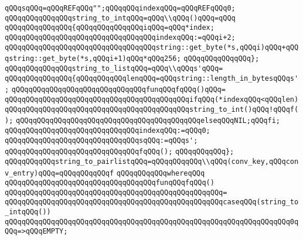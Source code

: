 \verb|qQQqsqQQq=qQQqREFqQQq"";qQQqqQQqindexqQQq=qQQqREFqQQq0;|\newline
\verb|qQQqqQQqqQQqqQQqstring_to_intqQQq=qQQq\\qQQq()qQQq=qQQq|\newline
\verb|qQQqqQQqqQQqqQQq{qQQqqQQqqQQqqQQqiqQQq=qQQq*index;|\newline
\verb|qQQqqQQqqQQqqQQqqQQqqQQqqQQqqQQqqQQqindexqQQq:=qQQqi+2;|\newline
\verb|qQQqqQQqqQQqqQQqqQQqqQQqqQQqqQQqqQQqstring::get_byte(*s,qQQqi)qQQq+qQQqstring::get_byte(*s,qQQqi+1)qQQq*qQQq256;|\newline
\verb|qQQqqQQqqQQqqQQq};|\newline
\newline
\verb|qQQqqQQqqQQqqQQqstring_to_listqQQq=qQQq\\qQQqs'qQQq=|\newline
\verb|qQQqqQQqqQQqqQQq{qQQqqQQqqQQqlenqQQq=qQQqstring::length_in_bytesqQQqs';|\newline
\verb|qQQqqQQqqQQqqQQqqQQqqQQqqQQqqQQqfunqQQqfqQQq()qQQq=|\newline
\verb|qQQqqQQqqQQqqQQqqQQqqQQqqQQqqQQqqQQqqQQqqQQqifqQQq(*indexqQQq<qQQqlen)|\newline
\verb|qQQqqQQqqQQqqQQqqQQqqQQqqQQqqQQqqQQqqQQqqQQqstring_to_int()qQQq!qQQqf();|\newline
\verb|qQQqqQQqqQQqqQQqqQQqqQQqqQQqqQQqqQQqqQQqqQQqelseqQQqNIL;qQQqfi;|\newline
\verb|qQQqqQQqqQQqqQQqqQQqqQQqqQQqqQQqindexqQQq:=qQQq0;|\newline
\verb|qQQqqQQqqQQqqQQqqQQqqQQqqQQqqQQqsqQQq:=qQQqs';|\newline
\verb|qQQqqQQqqQQqqQQqqQQqqQQqqQQqqQQqfqQQq();|\newline
\verb|qQQqqQQqqQQq};|\newline
\newline
\verb|qQQqqQQqqQQqstring_to_pairlistqQQq=qQQqqQQqqQQq\\qQQq(conv_key,qQQqconv_entry)qQQq=qQQqqQQqqQQqf|\newline
\verb|qQQqqQQqqQQqwhereqQQq|\newline
\verb|qQQqqQQqqQQqqQQqqQQqqQQqqQQqqQQqqQQqfunqQQqfqQQq()|\newline
\verb|qQQqqQQqqQQqqQQqqQQqqQQqqQQqqQQqqQQqqQQqqQQqqQQqqQQq=|\newline
\verb|qQQqqQQqqQQqqQQqqQQqqQQqqQQqqQQqqQQqqQQqqQQqqQQqqQQqcaseqQQq(string_to_intqQQq())|\newline
\verb|qQQqqQQqqQQqqQQqqQQqqQQqqQQqqQQqqQQqqQQqqQQqqQQqqQQqqQQqqQQqqQQqqQQq0qQQq=>qQQqEMPTY;|\newline
